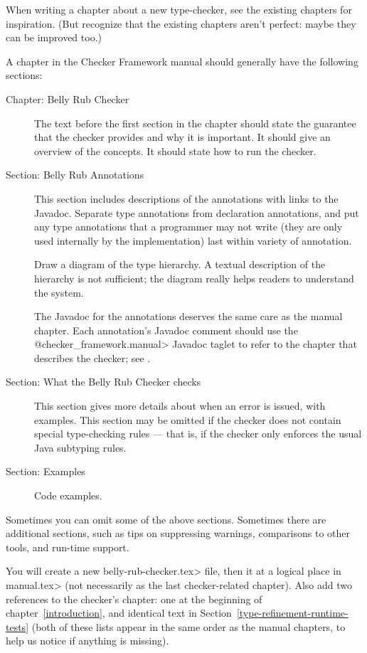 When writing a chapter about a new type-checker, see the existing chapters
for inspiration.  (But recognize that the existing chapters aren't perfect:
maybe they can be improved too.)

A chapter in the Checker Framework manual should generally have the
following sections:

\begin{description}
\item[Chapter: Belly Rub Checker]
  The text before the first section in the chapter should state the
  guarantee that the checker provides and why it is important.  It should
  give an overview of the concepts.  It should state how to run the checker.
\item[Section: Belly Rub Annotations]
  This section includes descriptions of the annotations with links to the
  Javadoc.  Separate type annotations from declaration annotations, and put
  any type annotations that a programmer may not write (they are only used
  internally by the implementation) last within variety of annotation.

  Draw a diagram of the type hierarchy.  A textual description of
  the hierarchy is not sufficient; the diagram really helps readers to
  understand the system.

  The Javadoc for the annotations deserves the same care as the manual
  chapter.  Each annotation's Javadoc comment should use the
  \<@checker\_framework.manual> Javadoc taglet to refer to the chapter that
  describes the checker; see .
\item[Section: What the Belly Rub Checker checks]
  This section gives more details about when an error is issued, with examples.
  This section may be omitted if the checker does not contain special
  type-checking rules --- that is, if the checker only enforces the usual
  Java subtyping rules.
\item[Section: Examples]
  Code examples.
\end{description}

Sometimes you can omit some of the above sections.  Sometimes there are
additional sections, such as tips on suppressing warnings, comparisons to
other tools, and run-time support.

You will create a new \<belly-rub-checker.tex> file,
then \verb|| it at a logical place in \<manual.tex> (not
necessarily as the last checker-related chapter).  Also add two references
to the checker's chapter:  one at the beginning of
chapter~\ref{introduction}, and identical text in
Section~\ref{type-refinement-runtime-tests} (both of these lists appear in
the same order as the manual chapters, to help us notice if anything is
missing).

